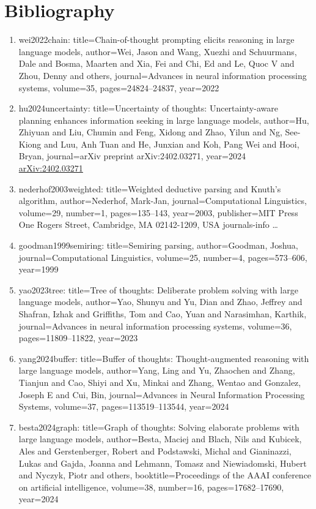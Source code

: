 \documentclass[11pt]{article}
\begin{document}
\section*{Bibliography}
\begin{enumerate}[leftmargin=*]
  \item wei2022chain: title=Chain-of-thought prompting elicits reasoning in large language models, author=Wei, Jason and Wang, Xuezhi and Schuurmans, Dale and Bosma, Maarten and Xia, Fei and Chi, Ed and Le, Quoc V and Zhou, Denny and others, journal=Advances in neural information processing systems, volume=35, pages=24824--24837, year=2022
  \item hu2024uncertainty: title=Uncertainty of thoughts: Uncertainty-aware planning enhances information seeking in large language models, author=Hu, Zhiyuan and Liu, Chumin and Feng, Xidong and Zhao, Yilun and Ng, See-Kiong and Luu, Anh Tuan and He, Junxian and Koh, Pang Wei and Hooi, Bryan, journal=arXiv preprint arXiv:2402.03271, year=2024 \href{https://arxiv.org/abs/2402.03271}{arXiv:2402.03271}
  \item nederhof2003weighted: title=Weighted deductive parsing and Knuth's algorithm, author=Nederhof, Mark-Jan, journal=Computational Linguistics, volume=29, number=1, pages=135--143, year=2003, publisher=MIT Press One Rogers Street, Cambridge, MA 02142-1209, USA journals-info …
  \item goodman1999semiring: title=Semiring parsing, author=Goodman, Joshua, journal=Computational Linguistics, volume=25, number=4, pages=573--606, year=1999
  \item yao2023tree: title=Tree of thoughts: Deliberate problem solving with large language models, author=Yao, Shunyu and Yu, Dian and Zhao, Jeffrey and Shafran, Izhak and Griffiths, Tom and Cao, Yuan and Narasimhan, Karthik, journal=Advances in neural information processing systems, volume=36, pages=11809--11822, year=2023
  \item yang2024buffer: title=Buffer of thoughts: Thought-augmented reasoning with large language models, author=Yang, Ling and Yu, Zhaochen and Zhang, Tianjun and Cao, Shiyi and Xu, Minkai and Zhang, Wentao and Gonzalez, Joseph E and Cui, Bin, journal=Advances in Neural Information Processing Systems, volume=37, pages=113519--113544, year=2024
  \item besta2024graph: title=Graph of thoughts: Solving elaborate problems with large language models, author=Besta, Maciej and Blach, Nils and Kubicek, Ales and Gerstenberger, Robert and Podstawski, Michal and Gianinazzi, Lukas and Gajda, Joanna and Lehmann, Tomasz and Niewiadomski, Hubert and Nyczyk, Piotr and others, booktitle=Proceedings of the AAAI conference on artificial intelligence, volume=38, number=16, pages=17682--17690, year=2024

\end{enumerate}
\end{document}
